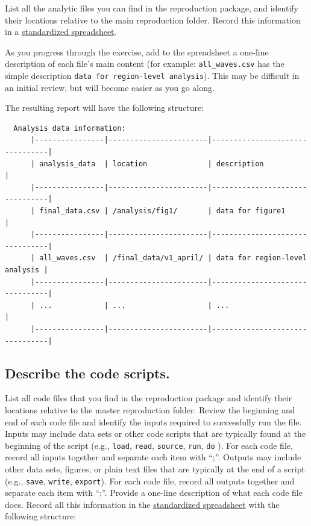 \documentclass[]{book}
\begin{document}
List all the analytic files you can find in the reproduction package, and identify their locations relative to the main reproduction folder. Record this information in a \href{https://docs.google.com/spreadsheets/d/1LUIdVFH0OfR70C7z07TYeE-uWzKI_JIeWUMaYhqEKK0/edit\#gid=1299317837\&range=A1}{standardized spreadsheet}.

As you progress through the exercise, add to the spreadsheet a one-line description of each file's main content (for example: \texttt{all\_waves.csv} has the simple description \texttt{data\ for\ region-level\ analysis}). This may be difficult in an initial review, but will become easier as you go along.

The resulting report will have the following structure:

\begin{verbatim}
  Analysis data information:
      |----------------|-----------------------|--------------------------------|
      | analysis_data  | location              | description                    |
      |----------------|-----------------------|--------------------------------|
      | final_data.csv | /analysis/fig1/       | data for figure1               |
      |----------------|-----------------------|--------------------------------|
      | all_waves.csv  | /final_data/v1_april/ | data for region-level analysis |
      |----------------|-----------------------|--------------------------------|
      | ...            | ...                   | ...                            |
      |----------------|-----------------------|--------------------------------|
\end{verbatim}

\hypertarget{desc-scripts}{%
\subsection{Describe the code scripts.}\label{desc-scripts}}

List all code files that you find in the reproduction package and identify their locations relative to the master reproduction folder. Review the beginning and end of each code file and identify the inputs required to successfully run the file. Inputs may include data sets or other code scripts that are typically found at the beginning of the script (e.g., \texttt{load}, \texttt{read}, \texttt{source}, \texttt{run}, \texttt{do} ). For each code file, record all inputs together and separate each item with ``;''. Outputs may include other data sets, figures, or plain text files that are typically at the end of a script (e.g., \texttt{save}, \texttt{write}, \texttt{export}). For each code file, record all outputs together and separate each item with ``;''. Provide a one-line description of what each code file does. Record all this information in the \href{https://docs.google.com/spreadsheets/d/1LUIdVFH0OfR70C7z07TYeE-uWzKI_JIeWUMaYhqEKK0/edit\#gid=1617799822\&range=A1}{standardized spreadsheet} with the following structure:
\end{document}
